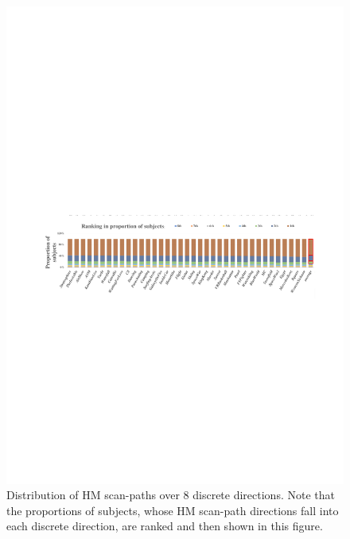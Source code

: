 \documentclass[10pt,journal,compsoc]{IEEEtran}
\begin{document}
\begin{figure}
	\begin{center}
		\centerline{\includegraphics[width=2\columnwidth]{figures/database/direction-consistence-distribution2}}%
		\caption{\footnotesize{Distribution of HM scan-paths over 8 discrete directions. Note that the proportions of subjects, whose HM scan-path directions fall into each discrete direction, are ranked and then shown in this figure.}}
		\label{direction-consistence-distribution}
	\end{center}
\end{figure}
\end{document}
